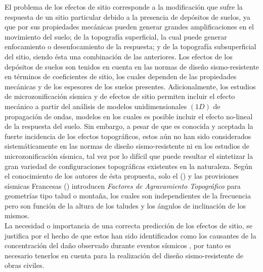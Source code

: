 \documentclass[spanish,letterpaper,12pt,twoside,openany]{article}
\begin{document}
El problema de los efectos de sitio corresponde a la modificación que sufre la respuesta de un sitio particular debido a la presencia de depósitos de suelos, ya que por sus propiedades mecánicas pueden generar grandes amplificaciones en el movimiento del suelo; de la topografía superficial, la cual puede generar enfocamiento o desenfocamiento de la respuesta; y de la topografía subsuperficial del sitio, siendo ésta una combinación de las anteriores. Los efectos de los depósitos de suelos son tenidos en cuenta en las normas de diseño sismo-resistente \citep{NSR-10} en términos de coeficientes de sitio, los cuales dependen de las propiedades mecánicas y de los espesores de los suelos presentes. Adicionalmente, los estudios de microzonificación sísmica y de efectos de sitio permiten incluir el efecto mecánico a partir del análisis de modelos unidimensionales $\left( 1D \right)$ de propagación de ondas, modelos en los cuales es posible incluir el efecto no-lineal de la respuesta del suelo. Sin embargo, a pesar de que es conocida y aceptada la fuerte incidencia de los efectos topográficos, estos aún no han sido considerados sistemáticamente en las normas de diseño sismo-resistente ni en los estudios de microzonificación sísmica, tal vez por lo difícil que puede resultar el sintetizar la gran variedad de configuraciones topográficas existentes en la naturaleza. Según el conocimiento de los autores de ésta propuesta, solo el \citeauthor{EC8} (\citeyear{EC8}) y las provisiones sísmicas Francesas \citeauthor{AFPS1995} (\citeyear{AFPS1995}) introducen \textit{Factores de Agravamiento Topográfico} para geometrías tipo talud o montaña, los cuales son independientes de la frecuencia pero son función de la altura de los taludes y los ángulos de inclinación de los mismos.\\
%
La necesidad o importancia de una correcta predicción de los efectos de sitio, se justifica por el hecho de que estos han sido identificados como los causantes de la concentración del daño observado durante eventos sísmicos \citep[por ejemplo en][]{Assimaki2013, Hough2011}, por tanto es necesario tenerlos en cuenta para la realización del diseño sismo-resistente de obras civiles.

%
\end{document}
